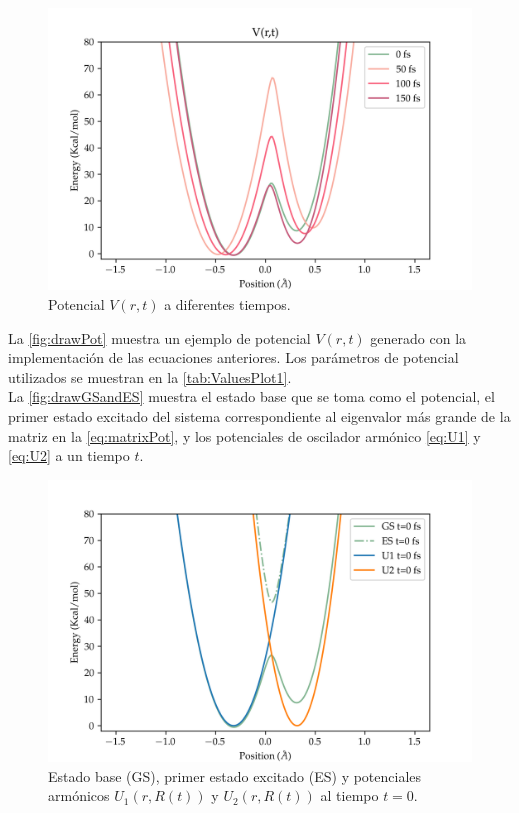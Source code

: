 \begin{figure}[ht]
  \centering
  \includegraphics[width=1\textwidth]{./img/ExamplesPotential1.png}
  \caption{Potencial $V(r,t)$ a diferentes tiempos.}
  \label{fig:drawPot}
\end{figure}

La \autoref{fig:drawPot} muestra un ejemplo de potencial $V(r,t)$ generado con la implementación de las ecuaciones anteriores. Los parámetros de potencial utilizados se muestran en la \autoref{tab:ValuesPlot1}.
\\
La \autoref{fig:drawGSandES} muestra el estado base que se toma como el potencial, el primer estado excitado del sistema correspondiente al eigenvalor más grande de la matriz en la \autoref{eq:matrixPot}, y los potenciales de oscilador armónico \autoref{eq:U1} y \autoref{eq:U2} a un tiempo $t$.

\begin{figure}[ht]
  \centering
  \includegraphics[width=1\textwidth]{./img/ExamplesGSandES.png}
  \caption{Estado base (GS), primer estado excitado (ES) y potenciales armónicos $U_1(r,R(t))$ y $U_2(r, R(t))$ al tiempo $t=0$.}
  \label{fig:drawGSandES}
\end{figure}


